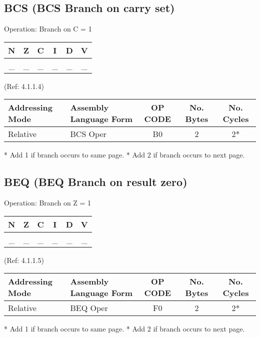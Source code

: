 \documentclass{article}
\begin{document}
  \subsection{BCS (BCS Branch on carry set)}

  Operation:  Branch on C = 1
  \begin{table}[H]
  \centering                           
  \begin{tabular}{|c c c c c c|}
  \hline
  N&Z&C&I&D&V\\
  \hline
  \_ & \_ & \_ & \_ & \_ & \_\\
  \hline
  \end{tabular}
  \end{table}
                               (Ref: 4.1.1.4)
  \begin{table}[H]
  \centering
  \begin{tabular}{|l|l|c|c|c|}
  \hline
  Addressing Mode & Assembly Language Form & OP CODE & No. Bytes & No. Cycles\\
  \hline
  Relative      &   BCS Oper            &    B0   &    2    &    2*\\
  \hline
  \end{tabular}
  \end{table}
  * Add 1 if branch occurs to same  page.
  * Add 2 if branch occurs to next  page.


  \subsection{BEQ (BEQ Branch on result zero)}
  Operation:  Branch on Z = 1
  \begin{table}[H]
  \centering                           
  \begin{tabular}{|c c c c c c|}
  \hline
  N&Z&C&I&D&V\\
  \hline
  \_ & \_ & \_ & \_ & \_ & \_\\
  \hline
  \end{tabular}
  \end{table}
                               (Ref: 4.1.1.5)
  \begin{table}[H]
  \centering
  \begin{tabular}{|l|l|c|c|c|}
  \hline
  Addressing Mode & Assembly Language Form & OP CODE & No. Bytes & No. Cycles\\
  \hline
  Relative    &   BEQ Oper            &    F0   &    2    &    2*\\
  \hline
  \end{tabular}
  \end{table}
  * Add 1 if branch occurs to same  page.
  * Add 2 if branch occurs to next  page.
\end{document}
